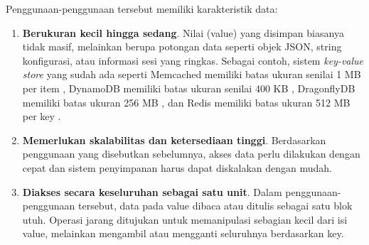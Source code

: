 Penggunaan-penggunaan tersebut memiliki karakteristik data:
\begin{enumerate}
	\item \textbf{Berukuran kecil hingga sedang}. Nilai (value) yang disimpan biasanya tidak masif, melainkan berupa potongan data seperti objek JSON, string konfigurasi, atau informasi sesi yang ringkas. Sebagai contoh, sistem \textit{key-value store} yang sudah ada seperti Memcached memiliki batas ukuran senilai 1 MB per item \parencite{memcached_docs}, DynamoDB memiliki batas ukuran senilai 400 KB \parencite{dynamodb_docs}, DragonflyDB memiliki batas ukuran 256 MB \parencite{dragonflydb_docs}, dan Redis memiliki batas ukuran 512 MB per key \parencite{redis_docs}.
	\item \textbf{Memerlukan skalabilitas dan ketersediaan tinggi}. Berdasarkan penggunaan yang disebutkan sebelumnya, akses data perlu dilakukan dengan cepat dan sistem penyimpanan harus dapat diskalakan dengan mudah.
	\item \textbf{Diakses secara keseluruhan sebagai satu unit}. Dalam penggunaan-penggunaan tersebut, data pada value dibaca atau ditulis sebagai satu blok utuh. Operasi jarang ditujukan untuk memanipulasi sebagian kecil dari isi value, melainkan mengambil atau mengganti seluruhnya berdasarkan key.
\end{enumerate}

